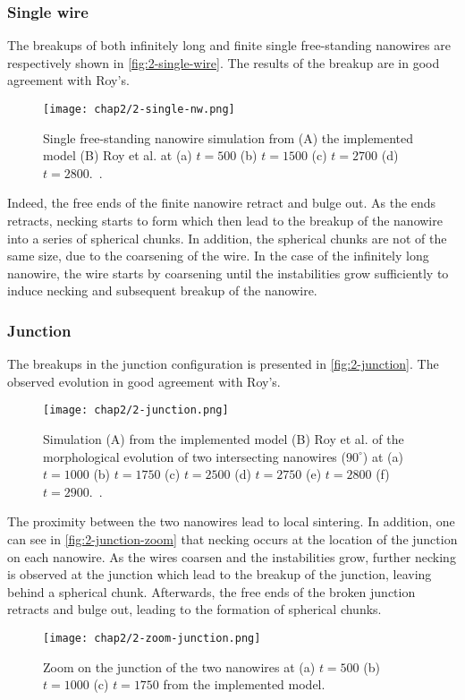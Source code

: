     \subsubsection{Single wire}
    The breakups of both infinitely long and finite single free-standing nanowires are respectively shown in \autoref{fig:2-single-wire}. The results of the breakup are in good agreement with Roy's. 
    \begin{figure}[H]
        \centering
        \texttt{[image: chap2/2-single-nw.png]}
        \caption{Single free-standing nanowire simulation from (A) the implemented model (B) Roy et al. at (a) $t=500$ (b) $t=1500$ (c) $t=2700$ (d) $t=2800$.\ \cite{RoyVarmaGururajan2021}.}
        \label{fig:2-single-wire}
    \end{figure}
    \newpage
    Indeed, the free ends of the finite nanowire retract and bulge out. As the ends retracts, necking starts to form which then lead to the breakup of the nanowire into a series of spherical chunks. In addition, the spherical chunks are not of the same size, due to the coarsening of the wire. In the case of the infinitely long nanowire, the wire starts by coarsening until the instabilities grow sufficiently to induce necking and subsequent breakup of the nanowire.
    \subsubsection{Junction}
    The breakups in the junction configuration is presented in \autoref{fig:2-junction}. The observed evolution in good agreement with Roy's. 
    \begin{figure}[H]
        \centering
        \texttt{[image: chap2/2-junction.png]}
        \caption{Simulation (A) from the implemented model (B) Roy et al. of the morphological evolution of two intersecting nanowires ($90^\circ$) at (a) $t=1000$ (b) $t=1750$ (c) $t=2500$ (d) $t=2750$ (e) $t=2800$ (f) $t=2900$.\ \cite{RoyVarmaGururajan2021}.}
        \label{fig:2-junction}
    \end{figure}
    The proximity between the two nanowires lead to local sintering. In addition, one can see in \autoref{fig:2-junction-zoom} that necking occurs at the location of the junction on each nanowire. As the wires coarsen and the instabilities grow, further necking is observed at the junction which lead to the breakup of the junction, leaving behind a spherical chunk. Afterwards, the free ends of the broken junction retracts and bulge out, leading to the formation of spherical chunks.
    \begin{figure}[H]
        \centering
        \texttt{[image: chap2/2-zoom-junction.png]}
        \caption{Zoom on the junction of the two nanowires at (a) $t=500$ (b) $t=1000$ (c) $t=1750$ from the implemented model.}
        \label{fig:2-junction-zoom}
    \end{figure}
